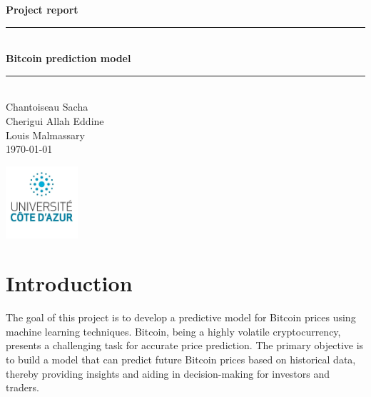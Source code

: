 \documentclass{article}
\begin{document}
\begin{titlepage}
    \vspace*{\fill}
    \begin{center}
        \Large \textbf{Project report} \\
        \vspace{0.5cm}
        \rule{\textwidth}{1pt} \\
        \vspace{0.5cm}
        \Huge \textbf{Bitcoin prediction model} \\
        \vspace{0.5cm}
        \rule{\textwidth}{1pt} \\
        \vspace{1cm}
        \Large Chantoiseau Sacha\\Cherigui Allah Eddine\\Louis Malmassary\\
        \vspace{1cm}
        \normalsize \today
    \end{center}
    \vspace*{\fill}
    \begin{flushleft}
        \includegraphics[width=0.2\textwidth]{img/UCA.png}
    \end{flushleft}
\end{titlepage}

\newpage

\tableofcontents

\newpage

\section{Introduction}
The goal of this project is to develop a predictive model for Bitcoin prices using machine learning techniques. Bitcoin, being a highly volatile cryptocurrency, presents a challenging task for accurate price prediction. The primary objective is to build a model that can predict future Bitcoin prices based on historical data, thereby providing insights and aiding in decision-making for investors and traders.
\end{document}
